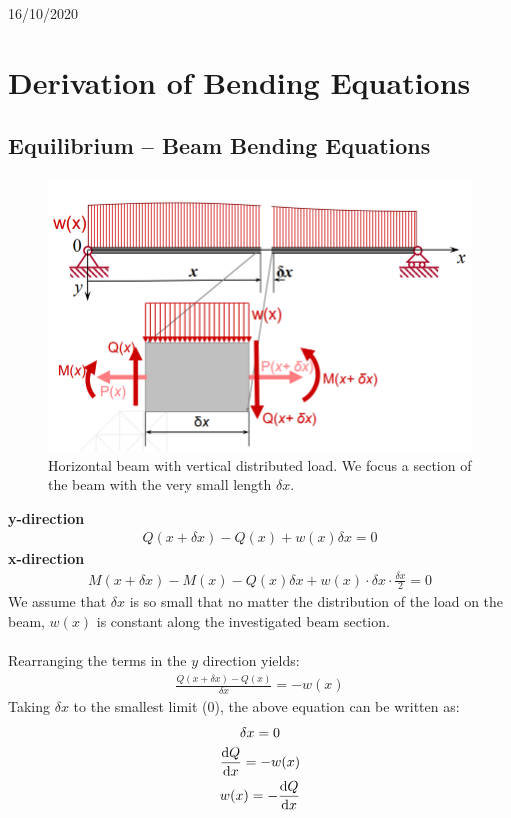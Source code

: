 \documentclass[class=report, crop=false, 12pt,a4paper]{standalone}
\begin{document}
\begin{center}
  16/10/2020
\end{center}
\section{Derivation of Bending Equations}
\subsection{Equilibrium – Beam Bending Equations}
\begin{figure}[H]
  \centering
  \includegraphics[width = 0.8 \textwidth]{../img/beam1.PNG}
  \caption{Horizontal beam with vertical distributed load. We focus a section of the beam with the very small length $\delta x$.}
\end{figure}
\textbf{y-direction}
\begin{gather}
  Q(x+\delta x) - Q(x) + w(x)\delta x = 0
\end{gather}
\textbf{x-direction}
\begin{gather}
  M(x+\delta x) - M(x) - Q(x)\delta x + w(x)\cdot \delta x \cdot \frac{\delta x}{2} = 0
\end{gather}
We assume that $\delta x$ is so small that no matter the distribution of the load on the beam, $w(x)$ is constant along the investigated beam section. \\\\
Rearranging the terms in the $y$ direction yields: 
\begin{gather}
  \frac{Q(x+\delta x)-Q(x)}{\delta x} = -w(x)
\end{gather}
Taking $\delta x$ to the smallest limit (0), the above equation can be written as:
\begin{gather}
  \delta x = 0 \\
  \frac{\dif Q}{\dif x} = -w(x) \\
  w(x) = -\frac{\dif Q}{\dif x}
  \label{loadiny}
\end{gather}
\end{document}
